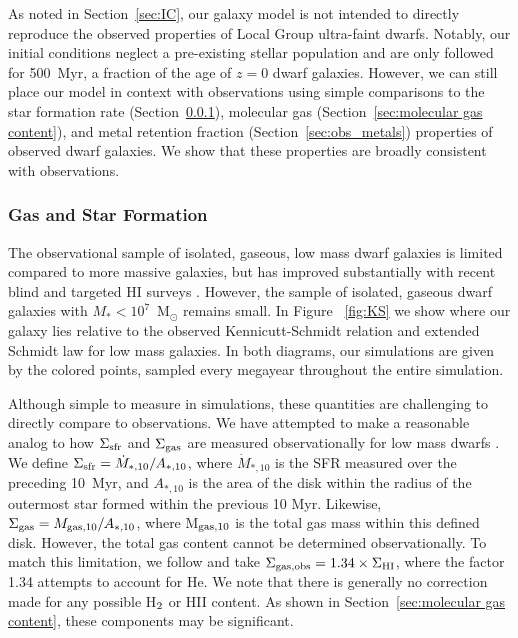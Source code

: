 \documentclass[fleqn,usenatbib,useAMS]{mnras}
\begin{document}
As noted in Section~\ref{sec:IC}, our galaxy model is not intended to directly reproduce the observed properties of Local Group ultra-faint dwarfs. Notably, our initial conditions neglect a pre-existing stellar population and are only followed for 500~Myr, a fraction of the age of $z = 0$ dwarf galaxies. However, we can still place our model in context with observations using simple comparisons to the star formation rate (Section~\ref{sec:gas_sf}), molecular gas (Section~\ref{sec:molecular gas content}), and metal retention fraction (Section~\ref{sec:obs_metals}) properties of observed dwarf galaxies. We show that these properties are broadly consistent with observations. 

\subsubsection{Gas and Star Formation}
\label{sec:gas_sf}

The observational sample of isolated, gaseous, low mass dwarf galaxies is limited compared to more massive galaxies, but has improved substantially with recent blind and targeted HI surveys \citep[e.g.][]{Giovanelli2005, Geha2006, Geha2012, Walter2008, Cannon2011, Haynes2011, Hunter2012, Bradford2015, James2015, Tollerud2015, Sand2015, Wang2017}. However, the sample of isolated, gaseous dwarf galaxies with $M_{*} < 10^{7}$~M$_{\odot}$ remains small. In Figure ~\ref{fig:KS} we show where our galaxy lies relative to the observed Kennicutt-Schmidt relation and extended Schmidt law for low mass galaxies. In both diagrams, our simulations are given by the colored points, sampled every megayear throughout the entire simulation. 

Although simple to measure in simulations, these quantities are challenging to directly compare to observations. We have attempted to make a reasonable analog to how $\Sigma_{\rm sfr}$ and $\Sigma_{\rm gas}$ are measured observationally for low mass dwarfs \citet[see ][]{Roychowdhury2014}. We define $\Sigma_{\rm sfr} = \dot{M}_{*,10} / A_{*,10}$, where $\dot{M}_{*,10}$ is the SFR measured over the preceding 10~Myr, and $A_{*,10}$ is the area of the disk within the radius of the outermost star formed within the previous 10 Myr. Likewise, $\Sigma_{\rm gas} = M_{\rm gas,10} / A_{*,10}$, where M$_{\rm gas,10}$ is the total gas mass within this defined disk. However, the total gas content cannot be determined observationally. To match this limitation, we follow \cite{Roychowdhury2014} and take $\Sigma_{\rm gas, obs} = 1.34 \times \Sigma_{\rm HI}$, where the factor 1.34 attempts to account for He. We note that there is generally no correction made for any possible H$_{\rm 2}$ or HII content. As shown in Section~\ref{sec:molecular gas content}, these components may be significant.
\end{document}
